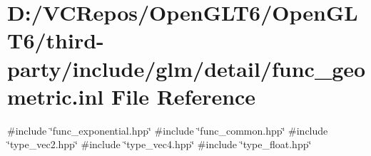 \hypertarget{func__geometric_8inl}{}\section{D\+:/\+V\+C\+Repos/\+Open\+G\+L\+T6/\+Open\+G\+L\+T6/third-\/party/include/glm/detail/func\+\_\+geometric.inl File Reference}
\label{func__geometric_8inl}
{\ttfamily \#include \char`\"{}func\+\_\+exponential.\+hpp\char`\"{}}\newline
{\ttfamily \#include \char`\"{}func\+\_\+common.\+hpp\char`\"{}}\newline
{\ttfamily \#include \char`\"{}type\+\_\+vec2.\+hpp\char`\"{}}\newline
{\ttfamily \#include \char`\"{}type\+\_\+vec4.\+hpp\char`\"{}}\newline
{\ttfamily \#include \char`\"{}type\+\_\+float.\+hpp\char`\"{}}\newline
